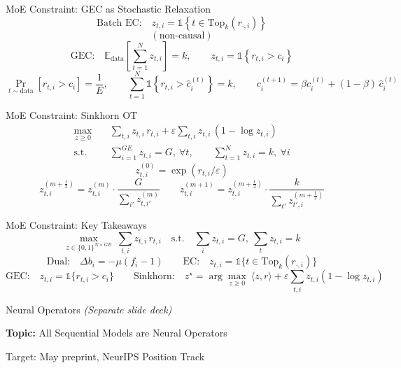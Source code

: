 \documentclass{beamer}
\begin{document}
\begin{frame}{MoE Constraint: GEC as Stochastic Relaxation}
\[
\text{Batch EC:}\quad z_{t,i} = \mathbb{1}\!\left\{t \in \mathrm{Top}_k(r_{\cdot,i})\right\}
\]
\[
(\text{non-causal})
\]
\[
\text{GEC:}\quad \mathbb{E}_{\text{data}}\!\left[\sum_{t=1}^N z_{t,i}\right] = k,
\qquad
z_{t,i} = \mathbb{1}\!\left\{r_{t,i} > c_i\right\}
\]
\[
\Pr_{t\sim \text{data}}\!\left[r_{t,i} > c_i\right] = \frac{1}{E},
\qquad
\sum_{t=1}^N \mathbb{1}\!\left\{r_{t,i} > \hat c_i^{(t)}\right\} = k,
\qquad
c_i^{(t+1)} = \beta c_i^{(t)} + (1-\beta)\,\hat c_i^{(t)}
\]
\end{frame}

\begin{frame}{MoE Constraint: Sinkhorn OT}
\begin{align*}
\max_{z \ge 0}\quad
& \sum_{t,i} z_{t,i}\, r_{t,i}
+ \varepsilon \sum_{t,i} z_{t,i}\,(1-\log z_{t,i}) \\
\text{s.t.}\quad
& \sum_{i=1}^{GE} z_{t,i} = G,\ \forall t,
\qquad
\sum_{t=1}^{N} z_{t,i} = k,\ \forall i
\end{align*}
\[
z^{(0)}_{t,i} = \exp(r_{t,i}/\varepsilon)
\]
\[
z^{(m+\frac{1}{2})}_{t,i}
= z^{(m)}_{t,i}\cdot \frac{G}{\sum_{i'} z^{(m)}_{t,i'}}
\qquad
z^{(m+1)}_{t,i}
= z^{(m+\frac{1}{2})}_{t,i}\cdot \frac{k}{\sum_{t'} z^{(m+\frac{1}{2})}_{t',i}}
\]
\end{frame}

\begin{frame}{MoE Constraint: Key Takeaways}
\[
\max_{z\in\{0,1\}^{N\times GE}} \ \sum_{t,i} z_{t,i}\, r_{t,i}
\quad \text{s.t.}\quad
\sum_i z_{t,i}=G,\ \sum_t z_{t,i}=k
\]
\[
\text{Dual:}\quad \Delta b_i = -\mu(f_i-1)
\qquad
\text{EC:}\quad z_{t,i}=\mathbb{1}\{t\in \mathrm{Top}_k(r_{\cdot,i})\}
\]
\[
\text{GEC:}\quad z_{t,i}=\mathbb{1}\{r_{t,i}>c_i\}
\qquad
\text{Sinkhorn:}\quad z^\star = \arg\max_{z\ge 0}\ \langle z,r\rangle + \varepsilon \sum_{t,i} z_{t,i}(1-\log z_{t,i})
\]
\end{frame}

\begin{frame}{Neural Operators}
\centering
\vspace{1cm}
{\Large \textit{(Separate slide deck)}}

\vspace{1cm}
\textbf{Topic:} All Sequential Models are Neural Operators

\vspace{0.5cm}
Target: May preprint, NeurIPS Position Track
\end{frame}
\end{document}
